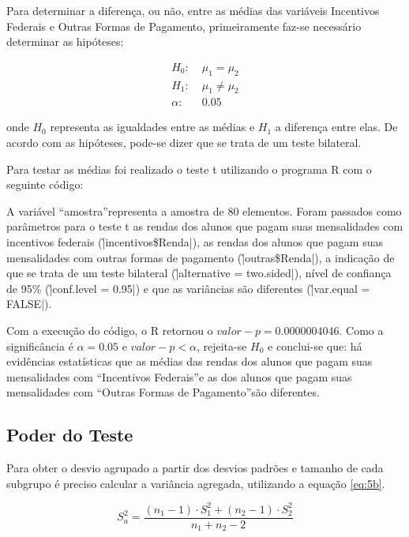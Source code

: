 Para determinar a diferença, ou não, entre as médias das variáveis Incentivos Federais e Outras Formas de Pagamento, primeiramente faz-se necessário determinar as hipóteses:

\begin{align*} 
		H_0\!:   &\; \mu_1 = \mu_2 \\
		H_1\!:   &\; \mu_1 \neq \mu_2  \\
		\alpha\!:&\; 0.05
\end{align*}

onde $H_{0}$ representa as igualdades entre as médias e $H_{1}$ a diferença entre elas. De acordo com as hipóteses, pode-se dizer que se trata de um teste bilateral.

Para testar as médias foi realizado o teste t utilizando o programa R com o seguinte código:


A variável \textquotedblleft amostra\textquotedblright representa a amostra de 80 elementos. Foram passados como parâmetros para o teste t as rendas dos alunos que pagam suas mensalidades com 
incentivos federais (\r|incentivos\$Renda|), as rendas dos alunos que pagam suas mensalidades com outras formas de pagamento (\r|outras\$Renda|), a indicação de que se trata de um teste bilateral 
(\r|alternative = two.sided|), nível de confiança de 95\% (\r|conf.level = 0.95|) e que as variâncias são diferentes (\r|var.equal = FALSE|).

Com a execução do código, o R retornou o $valor-p = 0.0000004046$. Como a significância é $\alpha = 0.05$ e $valor-p < \alpha$, rejeita-se $H_{0}$ e conclui-se que: há evidências estatísticas que as 
médias das rendas dos alunos que pagam suas mensalidades com \textquotedblleft Incentivos Federais\textquotedblright e as dos alunos que pagam suas mensalidades com \textquotedblleft Outras 
Formas de Pagamento\textquotedblright são diferentes. 

\subsection{Poder do Teste}

Para obter o desvio agrupado a partir dos desvios padrões e tamanho de cada subgrupo é preciso calcular a variância agregada, utilizando a equação \ref{eq:5b}.

\begin{equation}
 \label{eq:5b}
 S^2_a = \frac{(n_1 - 1) \cdot S^2_1 + (n_2 - 1) \cdot S^2_2}{n_1 + n_2 - 2}
\end{equation}

